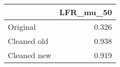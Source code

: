 \begin{tabular}{lr}
\toprule
{} & LFR_mu_50 \\
\midrule
Original    &     0.326 \\
Cleaned old &     0.938 \\
Cleaned new &     0.919 \\
\bottomrule
\end{tabular}
